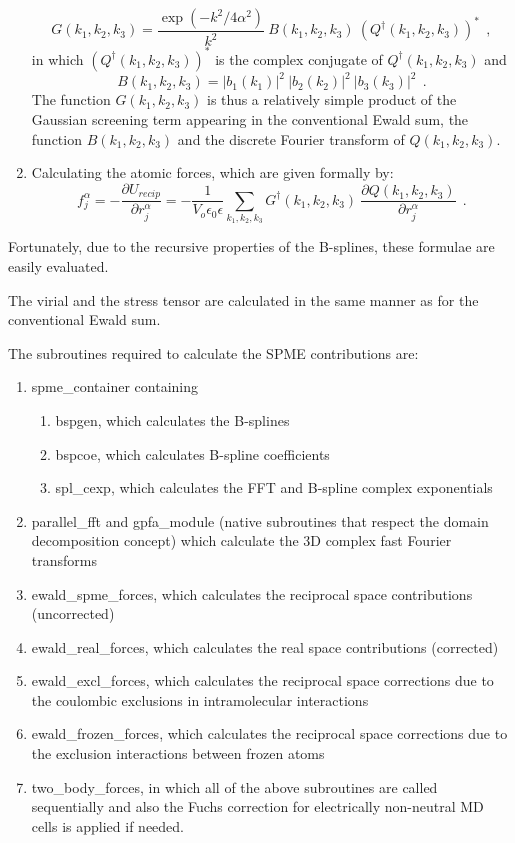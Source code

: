 \begin{enumerate}
\begin{equation}
G(k_{1},k_{2},k_{3}) = \frac{\exp(-k^{2}/4\alpha^{2})}{k^{2}}~
B(k_{1},k_{2},k_{3})~(Q^{\dagger}(k_{1},k_{2},k_{3}))^{*}~~,
\end{equation}
in which $(Q^{\dagger}(k_{1},k_{2},k_{3}))^{*}$ is the complex
conjugate of $Q^{\dagger}(k_{1},k_{2},k_{3})$ and
\begin{equation}
B(k_{1},k_{2},k_{3}) = |b_{1}(k_{1})|^{2}~|b_{2}(k_{2})|^{2}~|b_{3}(k_{3})|^{2}~~.
\end{equation}
The function $G(k_{1},k_{2},k_{3})$ is thus a relatively simple
product of the Gaussian screening term appearing in the
conventional Ewald sum, the function $B(k_{1},k_{2},k_{3})$ and
the discrete Fourier transform of $Q(k_{1},k_{2},k_{3})$.
\item Calculating the atomic forces, which are given formally by:
\begin{equation}
f_{j}^{\alpha} = -\frac{\partial U_{recip}}{\partial
r_{j}^{\alpha}} = -\frac{1}{V_{o} \epsilon_{0}\epsilon}
\sum_{k_{1},k_{2},k_{3}} G^{\dagger}(k_{1},k_{2},k_{3})
~\frac{\partial Q(k_{1},k_{2},k_{3})}{\partial r_{j}^{\alpha}}~~.
\end{equation}
\end{enumerate}
Fortunately, due to the recursive properties of the B-splines, these
formulae are easily evaluated.

The virial and the stress tensor are calculated in the same manner as
for the conventional Ewald sum.

The \D subroutines required to calculate the SPME contributions
are:
\begin{enumerate}
\item {\sc spme\_container} containing
\begin{enumerate}
\item {\sc bspgen}, which calculates the B-splines
\item {\sc bspcoe}, which calculates B-spline coefficients
\item {\sc spl\_cexp}, which calculates the FFT and B-spline complex exponentials
\end{enumerate}
\item {\sc parallel\_fft} and {\sc gpfa\_module} (native \D subroutines
that respect the domain decomposition concept) which calculate the
3D complex fast Fourier transforms
\item {\sc ewald\_spme\_forces}, which calculates the reciprocal space contributions (uncorrected)
\item {\sc ewald\_real\_forces}, which calculates the real space contributions (corrected)
\item {\sc ewald\_excl\_forces}, which calculates the reciprocal space corrections
due to the coulombic exclusions in intramolecular interactions
\item {\sc ewald\_frozen\_forces}, which calculates the reciprocal space corrections
due to the exclusion interactions between frozen atoms
\item {\sc two\_body\_forces}, in which all of the above
subroutines are called sequentially and also the Fuchs correction
\cite{fuchs-35a} for electrically non-neutral MD cells is applied if
needed.
\end{enumerate}

